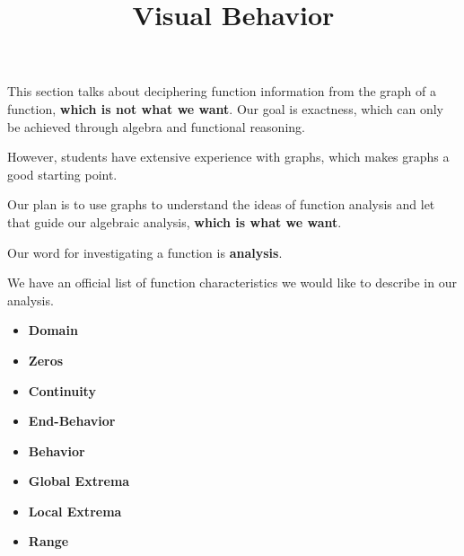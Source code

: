 \documentclass{ximera}
\title{Visual Behavior}
\begin{document}
\begin{abstract}
\end{abstract}
\maketitle





\begin{warning}


This section talks about deciphering function information from the graph of a function, \textbf{\textcolor{red!80!black}{which is not what we want}}.  Our goal is exactness, which can only be achieved through algebra and functional reasoning.

However, students have extensive experience with graphs, which makes graphs a good starting point. 

Our plan is to use graphs to understand the ideas of function analysis and let that guide our algebraic analysis, \textbf{\textcolor{red!80!black}{which is what we want}}.

\end{warning}






Our word for investigating a function is \textbf{\textcolor{blue!55!black}{analysis}}. 

We have an official list of function characteristics we would like to describe in our analysis. 





\begin{itemize}
\item \textbf{\textcolor{blue!55!black}{Domain}}
\item \textbf{\textcolor{blue!55!black}{Zeros}}
\item \textbf{\textcolor{blue!55!black}{Continuity}}
\item \textbf{\textcolor{blue!55!black}{End-Behavior}}
\item \textbf{\textcolor{blue!55!black}{Behavior}}
\item \textbf{\textcolor{blue!55!black}{Global Extrema}}
\item \textbf{\textcolor{blue!55!black}{Local Extrema}}
\item \textbf{\textcolor{blue!55!black}{Range}}
\end{itemize}
\end{document}
